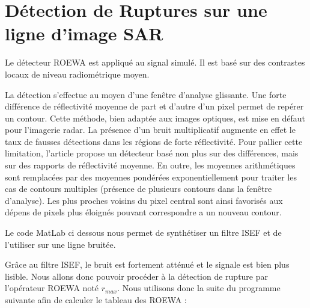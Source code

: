 \documentclass[a4paper,11pt]{article}
\newcommand{\FSource}[1]{%
  
  }
\begin{document}

\vspace{0.5cm}

\FSource{matlab/5.m}

\vspace{0.5cm}

\newpage

\section{Détection de Ruptures sur une ligne d'image SAR}

Le détecteur ROEWA est appliqué au signal simulé. Il est basé sur des contrastes locaux
de niveau radiométrique moyen.

La détection s'effectue au moyen d'une fenêtre d'analyse glissante. Une forte différence
de réflectivité moyenne de part et d'autre d'un pixel permet de repérer un contour. Cette
méthode, bien adaptée aux images optiques, est mise en défaut pour l'imagerie radar.
La présence d'un bruit multiplicatif augmente en effet le taux de fausses détections
dans les régions de forte réflectivité. Pour pallier cette limitation, l'article propose
un détecteur basé non plus sur des différences, mais sur des rapports de réflectivité
moyenne. En outre, les moyennes arithmétiques sont remplacées par des moyennes
pondérées exponentiellement pour traiter les cas de contours multiples (présence de
plusieurs contours dans la fenêtre d'analyse). Les plus proches voisins du pixel central sont 
ainsi favorisés aux dépens de pixels plus éloignés pouvant correspondre a un
nouveau contour.

Le code MatLab ci dessous nous permet de synthétiser un filtre ISEF et de l'utiliser sur une
ligne bruitée.

\vspace{0.5cm}

\FSource{matlab/6.m}

\vspace{0.5cm}


Grâce au filtre ISEF, le bruit est fortement atténué et le signale est bien plus lisible. Nous allons donc pouvoir procéder à la détection de rupture par l'opérateur ROEWA noté $r_{max}$. Nous utilisons donc la suite du programme suivante afin de calculer le tableau des ROEWA :

\vspace{0.5cm}
\end{document}
